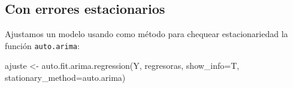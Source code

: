 \documentclass[
  12pt,
  a4paper]{article}
\newenvironment{Shaded}{\begin{snugshade}}{\end{snugshade}}
\newcommand{\AttributeTok}[1]{\textcolor[rgb]{0.77,0.63,0.00}{#1}}
\newcommand{\CommentTok}[1]{\textcolor[rgb]{0.56,0.35,0.01}{\textit{#1}}}
\newcommand{\DecValTok}[1]{\textcolor[rgb]{0.00,0.00,0.81}{#1}}
\newcommand{\FloatTok}[1]{\textcolor[rgb]{0.00,0.00,0.81}{#1}}
\newcommand{\FunctionTok}[1]{\textcolor[rgb]{0.00,0.00,0.00}{#1}}
\newcommand{\NormalTok}[1]{#1}
\newcommand{\OtherTok}[1]{\textcolor[rgb]{0.56,0.35,0.01}{#1}}
\newcommand{\SpecialCharTok}[1]{\textcolor[rgb]{0.00,0.00,0.00}{#1}}
\newcommand{\StringTok}[1]{\textcolor[rgb]{0.31,0.60,0.02}{#1}}
\begin{document}
\hypertarget{con-errores-estacionarios}{%
\subsection{Con errores estacionarios}\label{con-errores-estacionarios}}

\begin{Shaded}
\end{Shaded}

Ajustamos un modelo usando como método para chequear estacionariedad la
función \texttt{auto.arima}:

\begin{Shaded}
\begin{Highlighting}[]
\NormalTok{ajuste }\OtherTok{\textless{}{-}} \FunctionTok{auto.fit.arima.regression}\NormalTok{(Y, regresoras, }\AttributeTok{show\_info=}\NormalTok{T, }
                                    \AttributeTok{stationary\_method=}\StringTok{\textquotesingle{}auto.arima\textquotesingle{}}\NormalTok{)}
\end{Highlighting}
\end{Shaded}
\end{document}
